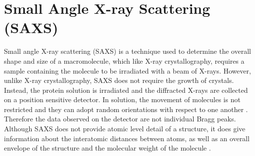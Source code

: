 \section{Small Angle X-ray Scattering (SAXS)}
\label{sec:Small Angle X-ray Scattering}
    Small angle X-ray scattering (SAXS) is a technique used to determine the overall shape and size of a macromolecule, which like X-ray crystallography, requires a sample containing the molecule to be irradiated with a beam of X-rays.
    However, unlike X-ray crystallography, SAXS does not require the growth of crystals.
    Instead, the protein solution is irradiated and the diffracted X-rays are collected on a position sensitive detector.
    In solution, the movement of molecules is not restricted and they can adopt random orientations with respect to one another \cite{blanchet2013small}.
    Therefore the data observed on the detector are not individual Bragg peaks.
    Although SAXS does not provide atomic level detail of a structure, it does give information about the interatomic distances between atoms, as well as an overall envelope of the structure and the molecular weight of the molecule \cite{pollack2011saxs}.

